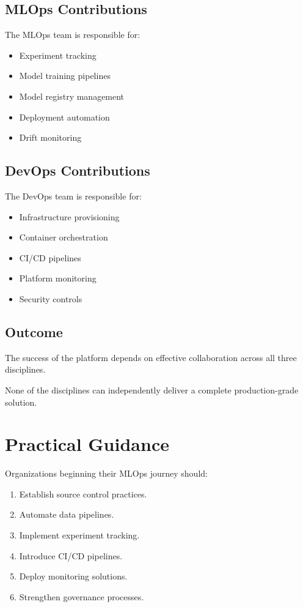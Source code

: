 \subsection{MLOps Contributions}

The MLOps team is responsible for:

\begin{itemize}
    \item Experiment tracking
    \item Model training pipelines
    \item Model registry management
    \item Deployment automation
    \item Drift monitoring
\end{itemize}

\subsection{DevOps Contributions}

The DevOps team is responsible for:

\begin{itemize}
    \item Infrastructure provisioning
    \item Container orchestration
    \item CI/CD pipelines
    \item Platform monitoring
    \item Security controls
\end{itemize}

\subsection{Outcome}

The success of the platform depends on effective collaboration across all three disciplines.

None of the disciplines can independently deliver a complete production-grade solution.

\section{Practical Guidance}

Organizations beginning their MLOps journey should:

\begin{enumerate}
    \item Establish source control practices.
    \item Automate data pipelines.
    \item Implement experiment tracking.
    \item Introduce CI/CD pipelines.
    \item Deploy monitoring solutions.
    \item Strengthen governance processes.
\end{enumerate}

